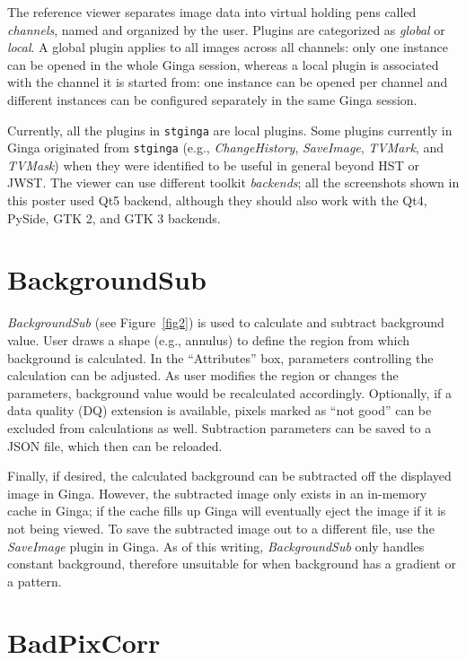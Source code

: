 \documentclass[11pt,twoside]{article}
\begin{document}
The reference viewer separates image data into virtual holding pens
called \emph{channels}, named and organized by the user.
Plugins are categorized as \emph{global} or \emph{local}.  A global
plugin applies to all images across all channels: only one instance can
be opened in the whole Ginga session, whereas a local plugin is
associated with the channel it is started from: one instance can be
opened per channel and different instances can be configured separately
in the same Ginga session.

Currently, all the plugins in {\tt stginga} are local plugins.
Some plugins currently in Ginga originated from {\tt stginga}
(e.g., {\em ChangeHistory}, {\em SaveImage}, {\em TVMark}, and {\em TVMask})
when they were identified to be useful in general beyond HST or JWST.
The viewer can use different toolkit \emph{backends};
all the screenshots shown in this poster used Qt5 backend, although they should
also work with the Qt4, PySide, GTK 2, and GTK 3 backends.

\section{BackgroundSub}

{\em BackgroundSub} (see Figure~\ref{fig2}) is used to calculate and subtract
background value. User draws a shape (e.g., annulus) to define
the region from which background is calculated. In the ``Attributes'' box,
parameters controlling the calculation can be adjusted.
As user modifies the region or changes the parameters, background value would
be recalculated accordingly.
Optionally, if a data quality (DQ) extension is available, pixels marked as
``not good'' can be excluded from calculations as well.
Subtraction parameters can be saved to a JSON file, which then can be reloaded.


Finally, if desired, the calculated background can be subtracted off
the displayed image in Ginga.
However, the subtracted image only exists in an in-memory cache in Ginga;
if the cache fills up Ginga will eventually eject the image if it is not
being viewed.
To save the subtracted image out to a different file, use the {\em SaveImage}
plugin in Ginga.
As of this writing, {\em BackgroundSub} only handles constant
background, therefore unsuitable for when background has a gradient or a
pattern.

\section{BadPixCorr}
\end{document}
